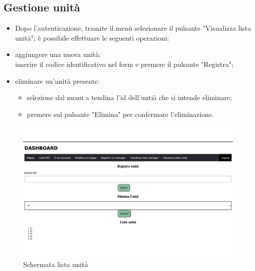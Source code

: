 \subsection{Gestione unità}
\begin{itemize}
\item Dopo l'autenticazione, tramite il menù selezionare il pulsante "Visualizza lista unità"; è possibile effettuare le seguenti operazioni:
    \item aggiungere una nuova unità: \\inserire il codice identificativo nel form e premere il pulsante "Registra";
    \item eliminare un'unità presente: 
    \begin{itemize}
        \item selezione dal menu a tendina l'id dell'untià che si intende eliminare;
        \item premere sul pulsante "Elimina" per confermare l'eliminazione.
    \end{itemize}
\end{itemize}
\begin{figure}[H]
    \centering
    \includegraphics[scale=0.12]{res/images/newunit_admin.png}
    \caption{Schermata lista unità}
\end{figure}